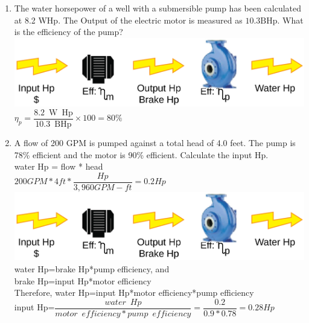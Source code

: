 \documentclass{article}
\begin{document}
\begin{enumerate}
\item The water horsepower of a well with a submersible pump has been calculated at 8.2 WHp. The Output of the electric motor is measured as $10.3 \mathrm{BHp}$. What is the efficiency of the pump?\\
  \vspace{0.2cm}
 \vspace{0.08cm}\includegraphics[scale=0.08]{PumpProblem}\\
 \vspace{0.2cm}
$\eta_p=\dfrac{8.2 \mathrm{\enspace W \enspace Hp}}{10.3 \mathrm{\enspace BHp}} \times 100=\boxed{80 \%}$
 \vspace{0.2cm}


\newpage
\item A flow of 200 GPM  is pumped against a total head of 4.0 feet. The pump is 78\% efficient and the motor is 90\% efficient. Calculate the input Hp.\\
\vspace{0.4cm}
water Hp = flow * head\\
\vspace{0.2cm}
$200GPM*4ft*\dfrac{Hp}{3,960 GPM-ft}=0.2Hp$\\
\vspace{0.4cm}\includegraphics[scale=0.08]{PumpProblem}\\
water Hp=brake Hp*pump efficiency, and\\
brake Hp=input Hp*motor efficiency\\
Therefore, water Hp=input Hp*motor efficiency*pump efficiency\\
\vspace{0.4cm}
input Hp=$\dfrac{water \enspace Hp}{motor \enspace efficiency*pump \enspace efficiency}=\dfrac{0.2}{0.9*0.78}=\boxed{0.28Hp}$
\vspace{0.2cm}


\end{enumerate}
\end{document}

